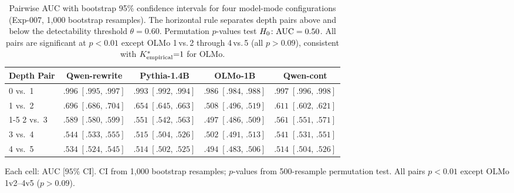 \begin{table}[t]
  \centering
  \footnotesize
  \caption{Pairwise AUC with bootstrap 95\% confidence intervals for four model-mode configurations (Exp-007, 1{,}000 bootstrap resamples). The horizontal rule separates depth pairs above and below the detectability threshold $\theta = 0.60$. Permutation $p$-values test $H_0\colon \text{AUC} = 0.50$. All pairs are significant at $p < 0.01$ except OLMo 1\,vs.\,2 through 4\,vs.\,5 (all $p > 0.09$), consistent with ${K^*_{\text{empirical}}}{=}1$ for OLMo.}
  \label{tab:s8_cv_folds}
  \begin{tabular}{lcccc}
    \toprule
    \textbf{Depth Pair} & \textbf{Qwen-rewrite} & \textbf{Pythia-1.4B} & \textbf{OLMo-1B} & \textbf{Qwen-cont} \\
    \midrule
    0 vs.\ 1
      & $.996\;[.995,\,.997]$
      & $.993\;[.992,\,.994]$
      & $.986\;[.984,\,.988]$
      & $.997\;[.996,\,.998]$ \\
    1 vs.\ 2
      & $.696\;[.686,\,.704]$
      & $.654\;[.645,\,.663]$
      & $.508\;[.496,\,.519]$
      & $.611\;[.602,\,.621]$ \\
    \cmidrule(lr){1-5}
    2 vs.\ 3
      & $.589\;[.580,\,.599]$
      & $.551\;[.542,\,.563]$
      & $.497\;[.486,\,.509]$
      & $.561\;[.551,\,.571]$ \\
    3 vs.\ 4
      & $.544\;[.533,\,.555]$
      & $.515\;[.504,\,.526]$
      & $.502\;[.491,\,.513]$
      & $.541\;[.531,\,.551]$ \\
    4 vs.\ 5
      & $.534\;[.524,\,.545]$
      & $.514\;[.502,\,.525]$
      & $.494\;[.483,\,.506]$
      & $.514\;[.504,\,.526]$ \\
    \bottomrule
  \end{tabular}

  \vspace{4pt}
  \footnotesize
  Each cell: AUC $[95\%$ CI$]$. CI from 1{,}000 bootstrap resamples; $p$-values from 500-resample permutation test.
  All pairs $p < 0.01$ except OLMo 1v2--4v5 ($p > 0.09$).
\end{table}

